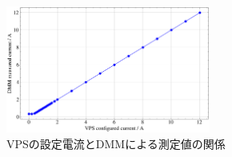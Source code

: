 \begin{figure}
	\centering
	\includegraphics[width=0.6\textwidth]{src/figures/exp2/vps-dmm.png}
	\caption{VPSの設定電流とDMMによる測定値の関係}\label{fig:exp2}
\end{figure}
